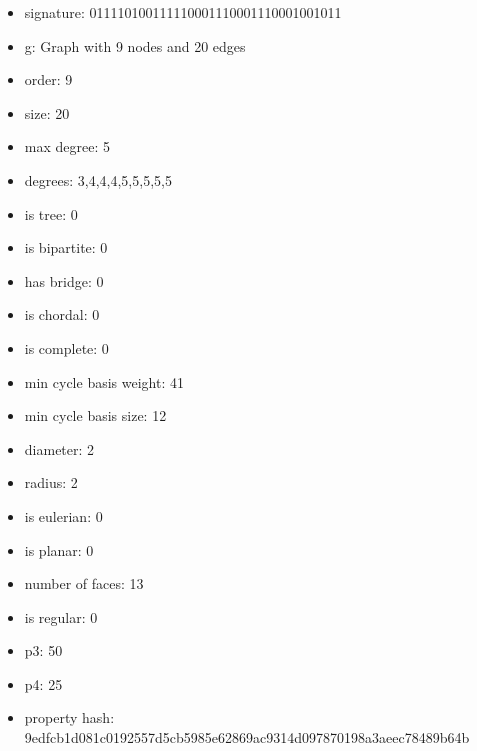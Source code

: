 \newpage
\begin{figure}
\end{figure}
\begin{itemize}
\item signature: 011110100111110001110001110001001011
\item g: Graph with 9 nodes and 20 edges
\item order: 9
\item size: 20
\item max degree: 5
\item degrees: 3,4,4,4,5,5,5,5,5
\item is tree: 0
\item is bipartite: 0
\item has bridge: 0
\item is chordal: 0
\item is complete: 0
\item min cycle basis weight: 41
\item min cycle basis size: 12
\item diameter: 2
\item radius: 2
\item is eulerian: 0
\item is planar: 0
\item number of faces: 13
\item is regular: 0
\item p3: 50
\item p4: 25
\item property hash: 9edfcb1d081c0192557d5cb5985e62869ac9314d097870198a3aeec78489b64b
\end{itemize}
